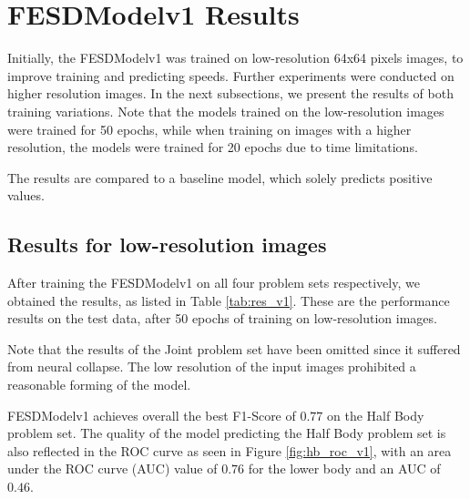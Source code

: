 \section{FESDModelv1 Results}
\label{sec:FESDModelv1_results}

Initially, the FESDModelv1 was trained on low-resolution 64x64 pixels images, to improve training and predicting speeds. Further experiments were conducted on higher resolution images. In the next subsections, we present the results of both training variations. Note that the models trained on the low-resolution images were trained for 50 epochs, while when training on images with a higher resolution, the models were trained for 20 epochs due to time limitations.

The results are compared to a baseline model, which solely predicts positive values.

\subsection{Results for low-resolution images}

After training the FESDModelv1 on all four problem sets respectively, we obtained the results, as listed in Table \ref{tab:res_v1}. These are the performance results on the test data, after 50 epochs of training on low-resolution images.

Note that the results of the Joint problem set have been omitted since it suffered from neural collapse. The low resolution of the input images prohibited a reasonable forming of the model.



FESDModelv1 achieves overall the best F1-Score of $0.77$ on the Half Body problem set. The quality of the model predicting the Half Body problem set is also reflected in the ROC curve as seen in Figure \ref{fig:hb_roc_v1}, with an area under the ROC curve (AUC) value of $0.76$ for the lower body and an AUC of $0.46$.


